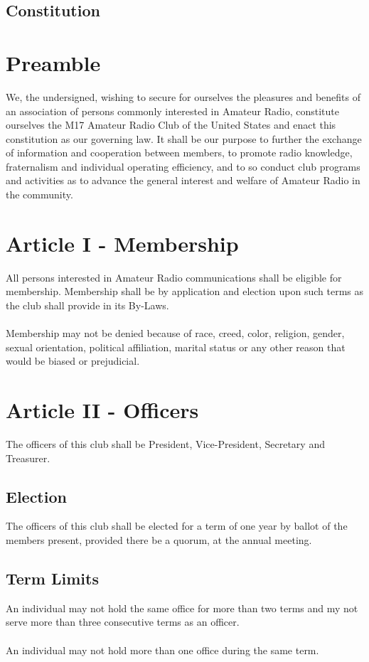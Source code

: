 \documentclass[english,12pt,letterpaper]{article}
\author{KC1AWV}
\begin{document}
	\begin{center}
		\section*{Constitution}
	\end{center}
	\section*{Preamble}
	We, the undersigned, wishing to secure for ourselves the pleasures and benefits of an association of persons commonly interested in Amateur Radio, constitute ourselves the M17 Amateur Radio Club of the United States and enact this constitution as our governing law. It shall be our purpose to further the exchange of information and cooperation between members, to promote radio knowledge, fraternalism and individual operating efficiency, and to so conduct club programs and activities as to advance the general interest and welfare of Amateur Radio in the community.
	\section{Article I - Membership}
	All persons interested in Amateur Radio communications shall be eligible for membership. Membership shall be by application and election upon such terms as the club shall provide in its By-Laws. \\
	\\
	Membership may not be denied because of race, creed, color, religion, gender, sexual orientation, political affiliation, marital status or any other reason that would be biased or prejudicial.
	\section{Article II - Officers}
	The officers of this club shall be President, Vice-President, Secretary and Treasurer.
	\subsection{Election}
	The officers of this club shall be elected for a term of one year by ballot of the members present, provided there be a quorum, at the annual meeting.
	\subsection{Term Limits}
	An individual may not hold the same office for more than two terms and my not serve more than three consecutive terms as an officer. \\
	\\
	An individual may not hold more than one office during the same term.
\end{document}
